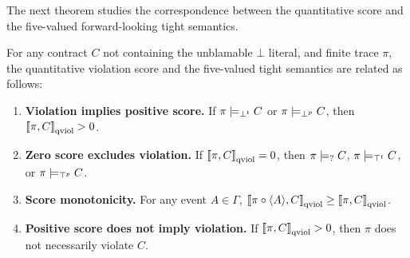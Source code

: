 The next theorem studies the correspondence between the quantitative score and the five-valued forward-looking tight semantics.
\begin{theorem}
  \label{thm:quant-consistency}
  For any contract $C$ not containing the unblamable $\bot$ literal, and finite trace $\pi$, the quantitative violation score and the five-valued tight semantics are related as follows:
  \begin{enumerate}
      \item \textbf{Violation implies positive score.}
      If $\pi \models_{\bot^t} C$ or $\pi \models_{\bot^p} C$, then $\left\llbracket \pi, C \right\rrbracket_{\text{qviol}} > 0$.

      \item \textbf{Zero score excludes violation.}
      If $\left\llbracket \pi, C \right\rrbracket_{\text{qviol}} = 0$, then $\pi \models_{?} C$, $\pi \models_{\top^t} C$, or $\pi \models_{\top^p} C$.

      \item \textbf{Score monotonicity.}
      For any event $A \in \Gamma$, $\left\llbracket \pi \circ \langle A \rangle , C \right\rrbracket_{\text{qviol}} \ge \left\llbracket \pi, C \right\rrbracket_{\text{qviol}}$.

      \item \textbf{Positive score does not imply violation.}
      If $\left\llbracket \pi, C \right\rrbracket_{\text{qviol}} > 0$, then $\pi$ does not necessarily violate $C$.
  \end{enumerate}
  \end{theorem}
  
